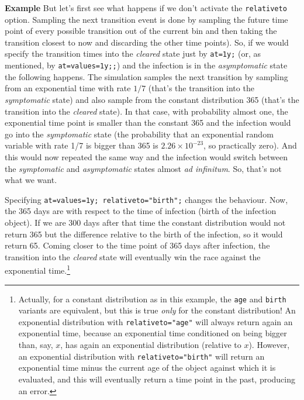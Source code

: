 \documentclass[11pt]{article}
\newenvironment{example}{\par\smallskip\noindent\begingroup\small\textbf{\small Example\enskip}}{\endgroup\par\smallskip}
\begin{document}
\begin{itemize}
\begin{example}
But let's first see what happens if we don't activate the \texttt{relativeto}
option. Sampling the next transition event is done by sampling the future time
point of every possible transition out of the current bin and then taking the
transition closest to now and discarding the other time points). So, if we would
specify the transition times into the \emph{cleared} state just by
\texttt{at=1y;} (or, as mentioned, by
\texttt{at=values=1y;;}) and the infection is in the
\emph{asymptomatic} state the following happens. The simulation
samples the next transition by sampling from an exponential time with rate $1/7$
(that's the transition into the \emph{symptomatic} state) and also sample from
the constant distribution 365 (that's the transition into the \emph{cleared}
state). In that case, with probability almost one, the exponential time point is
smaller than the constant 365 and the infection would go into the
\emph{symptomatic} state (the probability that an exponential random variable
with rate 1/7 is bigger than 365 is $2.26\times10^{-23}$, so practically zero).
And this would now repeated the same way and the infection would switch between
the \emph{symptomatic} and \emph{asymptomatic} states almost \emph{ad 
infinitum}. So, that's not what we want. 

Specifying \texttt{at=values=1y; relativeto="birth";}
changes the behaviour. Now, the 365 days are with respect to the time of
infection (birth of the infection object). If we are 300 days after that time
the constant distribution would not return 365 but the difference relative to
the birth of the infection, so it would return 65. Coming closer to the time
point of 365 days after infection, the transition into the \emph{cleared} state
will eventually win the race against the exponential time.\footnote{Actually,
for a constant distribution as in this example, the \texttt{age} and
\texttt{birth} variants are equivalent, but this is true \emph{only} for the
constant distribution! An exponential distribution with
\texttt{relativeto="age"} will always return again an exponential time, because
an exponential time conditioned on being bigger than, say, $x$, has again an
exponential distribution (relative to $x$). However, an exponential distribution
with \texttt{relativeto="birth"} will return an exponential time minus the
current age of the object against which it is
evaluated, and this will eventually return a time point in the past,
producing an error.}
\end{example}


\end{itemize}
\end{document}
